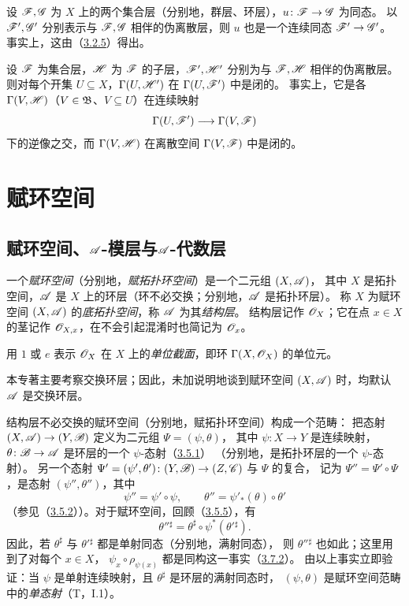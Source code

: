 设 $\mathscr F,\mathscr G$ 为 $X$ 上的两个集合层（分别地，群层、环层），$u\colon\mathscr F\to\mathscr G$ 为同态。
以 $\mathscr F',\mathscr G'$ 分别表示与 $\mathscr F,\mathscr G$ 相伴的伪离散层，则 $u$ 也是一个连续同态 $\mathscr F'\to\mathscr G'$。
事实上，这由（\hyperlink{para:0:3.2.5}{3.2.5}）得出。

设 $\mathscr F$ 为集合层，$\mathscr H$ 为 $\mathscr F$ 的子层，$\mathscr F',\mathscr H'$ 分别为与 $\mathscr F,\mathscr H$ 相伴的伪离散层。
则对每个开集 $U\subseteq X$，$\Gamma(U,\mathscr H')$ 在 $\Gamma(U,\mathscr F')$ 中是闭的。
事实上，它是各 $\Gamma(V,\mathscr H)$（$V\in\mathfrak B$、$V\subseteq U$）在连续映射
\[
 \Gamma(U,\mathscr F')\longrightarrow\Gamma(V,\mathscr F)
\]
下的逆像之交，而 $\Gamma(V,\mathscr H)$ 在离散空间 $\Gamma(V,\mathscr F)$ 中是闭的。



\par

\section{赋环空间}\hypertarget{heading:0:4}{}
\subsection{赋环空间、\texorpdfstring{$\mathscr A$}{A}-模层与\texorpdfstring{$\mathscr A$}{A}-代数层}\hypertarget{heading:0:4.1}{}

一个\emph{赋环空间}（分别地，\emph{赋拓扑环空间}）是一个二元组 $(X,\mathscr A)$，
其中 $X$ 是拓扑空间，$\mathscr A$ 是 $X$ 上的环层（环不必交换；分别地，$\mathscr A$ 是拓扑环层）。
称 $X$ 为赋环空间 $(X,\mathscr A)$ 的\emph{底拓扑空间}，称 $\mathscr A$ 为其\emph{结构层}。
结构层记作 $\mathscr O_X$；它在点 $x\in X$ 的茎记作 $\mathscr O_{X,x}$，在不会引起混淆时也简记为 $\mathscr O_x$。

用 $1$ 或 $e$ 表示 $\mathscr O_X$ 在 $X$ 上的\emph{单位截面}，即环 $\Gamma(X,\mathscr O_X)$ 的单位元。

本专著主要考察交换环层；因此，未加说明地谈到赋环空间 $(X,\mathscr A)$ 时，均默认 $\mathscr A$ 是交换环层。

结构层不必交换的赋环空间（分别地，赋拓扑环空间）构成一个范畴：
把态射 $(X,\mathscr A)\to(Y,\mathscr B)$ 定义为二元组 $\Psi=(\psi,\theta)$，
其中 $\psi\colon X\to Y$ 是连续映射，$\theta\colon\mathscr B\to\mathscr A$ 是环层的一个 $\psi$-态射（\hyperlink{para:0:3.5.1}{3.5.1}）
（分别地，是拓扑环层的一个 $\psi$-态射）。
另一个态射 $\Psi'=(\psi',\theta')\colon(Y,\mathscr B)\to(Z,\mathscr C)$ 与 $\Psi$ 的复合，
记为 $\Psi''=\Psi'\circ\Psi$，是态射 $(\psi'',\theta'')$，其中
\[
 \psi''=\psi'\circ\psi,\qquad
 \theta''=\psi'_*(\theta)\circ\theta'
\]
（参见（\hyperlink{para:0:3.5.2}{3.5.2}））。对于赋环空间，回顾（\hyperlink{para:0:3.5.5}{3.5.5}），有
\[
 \theta''{}^\sharp=\theta^\sharp\circ\psi^*(\theta'{}^\sharp).
\]
因此，若 $\theta^\sharp$ 与 $\theta'{}^\sharp$ 都是单射同态（分别地，满射同态），
则 $\theta''{}^\sharp$ 也如此；这里用到了对每个 $x\in X$，
$\psi_x\circ\rho_{\psi(x)}$ 都是同构这一事实（\hyperlink{para:0:3.7.2}{3.7.2}）。
由以上事实立即验证：当 $\psi$ 是单射连续映射，且 $\theta^\sharp$ 是环层的满射同态时，
$(\psi,\theta)$ 是赋环空间范畴中的\emph{单态射}（T，I.1）。

